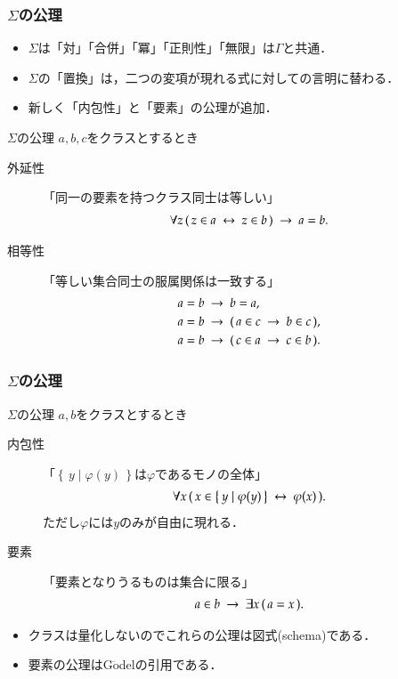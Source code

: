 \documentclass[dvipdfmx,10pt,notheorems]{beamer}
\theoremstyle{definition}
\newcommand{\Set}[2]{\left\{\, #1 \mid #2\, \right\}} %
\newcommand{\rarrow}{\hspace{0.25em}\rightarrow\hspace{0.25em}} %
\newcommand{\lrarrow}{\hspace{0.25em}\leftrightarrow\hspace{0.25em}} %
\begin{document}
\begin{frame}\frametitle{$\Sigma$の公理}
	\begin{itemize}
		\item $\Sigma$は「対」「合併」「冪」「正則性」「無限」は$\Gamma$と共通．
		\item $\Sigma$の「置換」は，二つの変項が現れる式に対しての言明に替わる．
		\item 新しく「内包性」と「要素」の公理が追加．
	\end{itemize}
	
	\begin{alertblock}{$\Sigma$の公理}
		$a,b,c$をクラスとするとき
		\begin{description}
			\item[外延性] 「同一の要素を持つクラス同士は等しい」
				\begin{align}
					\forall z\, (\, z \in a \lrarrow z \in b\, ) \rarrow a = b.
				\end{align}
			\item[相等性] 「等しい集合同士の服属関係は一致する」
				\begin{align}
					&a = b \rarrow b = a, \\
					&a = b \rarrow (\, a \in c \rarrow b \in c\, ), \\
					&a = b \rarrow (\, c \in a \rarrow c \in b\, ).
				\end{align}
		\end{description}	
	\end{alertblock}
\end{frame}

\begin{frame}\frametitle{$\Sigma$の公理}
	
	\begin{alertblock}{$\Sigma$の公理}
		$a,b$をクラスとするとき
		\begin{description}
			\item[内包性] 「$\Set{y}{\varphi(y)}$は$\varphi$であるモノの全体」
				\begin{align}
					\forall x\, (\, x \in \Set{y}{\varphi(y)} \lrarrow \varphi(x)\, ).
				\end{align}
				ただし$\varphi$には$y$のみが自由に現れる．
				
			\item[要素] 「要素となりうるものは集合に限る」
				\begin{align}
					a \in b \rarrow \exists x\, (\, a = x\, ).
				\end{align}
		\end{description}	
	\end{alertblock}
	
	\begin{itemize}	
		\item クラスは量化しないのでこれらの公理は図式(schema)である．	
		\item 要素の公理はG$\ddot{\mbox{o}}$del\cite{Godel}の引用である．
	\end{itemize}
\end{frame}
\end{document}
